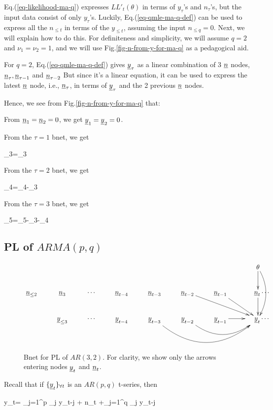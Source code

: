 Eq.(\ref{eq-likelihood-ma-q})
expresses $ LL'_t(\theta)$
in terms of $y_\tau$'s and $n_\tau$'s,
but the input data
consist of only $y_\tau$'s.
Luckily,
Eq.(\ref{eq-qmle-ma-q-def})
can be used to express
all the $n_{\leq t}$
in terms of the
$y_{\leq t}$,
assuming the input $n_{\leq q}=0$.
Next, we will
explain how to do this.
For definiteness and simplicity,
we  will assume $q=2$ and
$\nu_1=\nu_2=1$, and we will
use
 Fig.\ref{fig-n-from-y-for-ma-q}
as a pedagogical aid.

For $q=2$,
Eq.(\ref{eq-qmle-ma-q-def})
gives ${\underline{y}}_\tau$ as a linear
combination of 3 ${\underline{n}}$ nodes,
 ${\underline{n}}_\tau,{\underline{n}}_{\tau-1}$ and ${\underline{n}}_{\tau-2}$
But since it's a linear equation,
it can be used to
express the latest ${\underline{n}}$ node,
i.e., ${\underline{n}}_{\tau}$,
in terms of ${\underline{y}}_{\tau}$
and the 2 previous ${\underline{n}}$
nodes.

Hence,
we see from Fig.\ref{fig-n-from-y-for-ma-q}
that:

From ${\underline{n}}_1={\underline{n}}_2=0$,
we get ${\underline{y}}_1={\underline{y}}_2=0$.

From the $\tau=1$ bnet, we get

\beq
\rvn_3=\rvy_3
\eeq

From the $\tau=2$ bnet, we get

\beq
\rvn_4=\rvy_4-\rvn_3
\eeq

From the $\tau=3$ bnet, we get

\beq
\rvn_5=\rvy_5-\rvn_3-\rvn_4
\eeq

\subsection{PL of $ARMA(p,q)$}


\begin{figure}[h!]
$$
\xymatrix{
&&&&&&&\theta\ar[d]\ar@/^1pc/[dd]
\\
\rvn_{\leq 2}
&\rvn_{3}
&\cdots
&\rvn_{t-4}
&\rvn_{t-3}
&\rvn_{t-2}\ar[drr]
&\rvn_{t-1}\ar[dr]
&\;\;\;\;\rvn_{t}\ar[d]
\cdots
\\
\;
&\rvy_{\leq 3}
&\cdots
&\rvy_{t-4}
&\rvy_{t-3}\ar@/_3pc/[rrr]
&\rvy_{t-2}\ar@/_2pc/[rr]
&\rvy_{t-1}\ar[r]
&\;\;\;\;\rvy_{t}
\cdots
\\
\;
}
$$
\caption{Bnet for PL of
$AR(3, 2)$.
For clarity,
we show only the
arrows entering nodes ${\underline{y}}_t$
and ${\underline{n}}_t$.}
\label{fig-qmle-arma-3-2}
\end{figure}

Recall that
if ${\{{\underline{y}}_t\}_{\forall t}}$ is an
$AR(p,q)$ t-series, then

\beq
y_t=
\sum_{j=1}^p
\alp_j y_{t-j} + n_t
+\sum_{j=1}^q \nu_j y_{t-j}
\label{eq-qmle-arma-p-q-def}
\eeq

